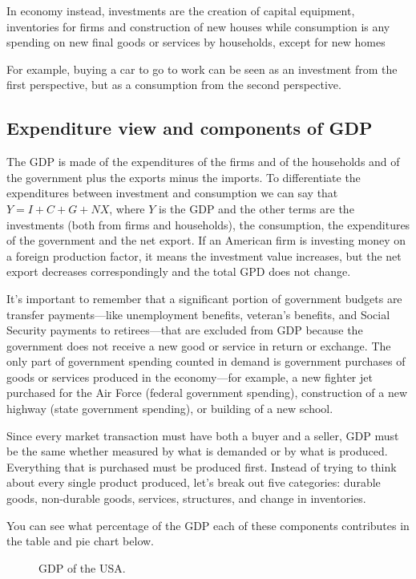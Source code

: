 In economy instead, investments are the creation of capital equipment, inventories for firms and construction of new houses while consumption is any spending on new final goods or services by households, except for new homes

For example, buying a car to go to work can be seen as an investment from the first perspective, but as a consumption from the second perspective.

\subsection{Expenditure view and components of GDP}
The GDP is made of the expenditures of the firms and of the households and of the government plus the exports minus the imports. To differentiate the expenditures between investment and consumption we can say that $Y = I + C + G + NX$, where $Y$ is the GDP and the other terms are the investments (both from firms and households), the consumption, the expenditures of the government and the net export. If an American firm is investing money on a foreign production factor, it means the investment value increases, but the net export decreases correspondingly and the total GPD does not change.

It's important to remember that a significant portion of government budgets are transfer payments—like unemployment benefits, veteran’s benefits, and Social Security payments to retirees—that are excluded from GDP because the government does not receive a new good or service in return or exchange. The only part of government spending counted in demand is government purchases of goods or services produced in the economy—for example, a new fighter jet purchased for the Air Force (federal government spending), construction of a new highway (state government spending), or building of a new school.

Since every market transaction must have both a buyer and a seller, GDP must be the same whether measured by what is demanded or by what is produced.
Everything that is purchased must be produced first. Instead of trying to think about every single product produced, let's break out five categories: durable goods, non-durable goods, services, structures, and change in inventories. 

You can see what percentage of the GDP each of these components contributes in the table and pie chart below.

\begin{figure}
    \caption{GDP of the USA.}
    \label{fig:usa_gdp1}
\end{figure}

